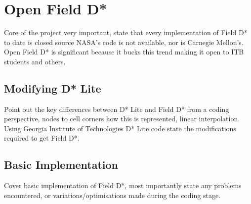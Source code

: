 
\section{Open Field D*}
Core of the project very important, state that every implementation of Field D* to date is closed source NASA's code is not available, nor is Carnegie Mellon's. Open Field D* is significant because it bucks this trend making it open to ITB students and others.

\subsection{Modifying D* Lite}
Point out the key differences between D* Lite and Field D* from a coding perspective, nodes to cell corners how this is represented, linear interpolation. Using Georgia Institute of Technologies D* Lite code state the modifications required to get Field D*.

\subsection{Basic Implementation}
Cover basic implementation of Field D*, most importantly state any problems encountered, or variations/optimisations made during the coding stage.

